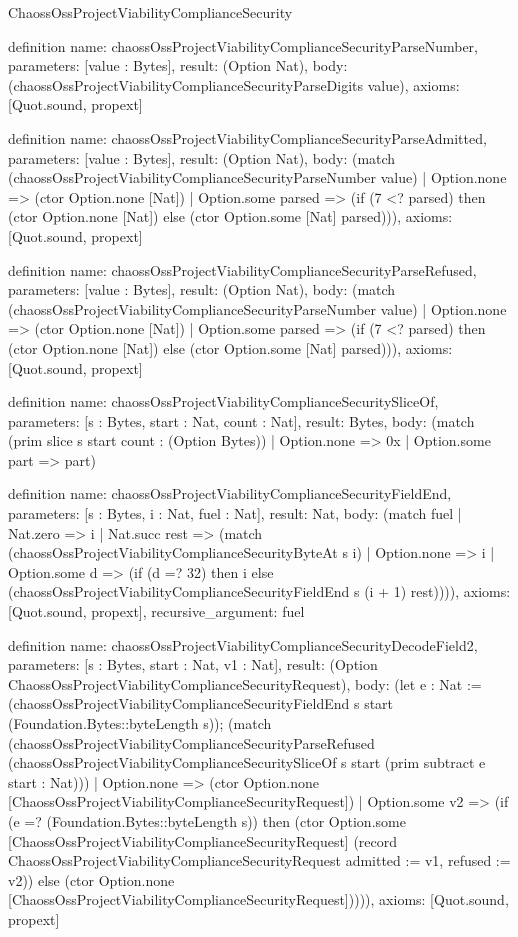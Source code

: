 \begin{lexlean}{ChaossOssProjectViabilityComplianceSecurity}
\begin{semanticmodule}
definition{
  name: chaossOssProjectViabilityComplianceSecurityParseNumber,
  parameters: [value : Bytes],
  result: (Option Nat),
  body: (chaossOssProjectViabilityComplianceSecurityParseDigits value),
  axioms: [Quot.sound, propext]
}

definition{
  name: chaossOssProjectViabilityComplianceSecurityParseAdmitted,
  parameters: [value : Bytes],
  result: (Option Nat),
  body: (match (chaossOssProjectViabilityComplianceSecurityParseNumber value)
    | Option.none => (ctor Option.none [Nat])
    | Option.some parsed => (if (7 <? parsed) then (ctor Option.none [Nat]) else (ctor Option.some [Nat] parsed))),
  axioms: [Quot.sound, propext]
}

definition{
  name: chaossOssProjectViabilityComplianceSecurityParseRefused,
  parameters: [value : Bytes],
  result: (Option Nat),
  body: (match (chaossOssProjectViabilityComplianceSecurityParseNumber value)
    | Option.none => (ctor Option.none [Nat])
    | Option.some parsed => (if (7 <? parsed) then (ctor Option.none [Nat]) else (ctor Option.some [Nat] parsed))),
  axioms: [Quot.sound, propext]
}

definition{
  name: chaossOssProjectViabilityComplianceSecuritySliceOf,
  parameters: [s : Bytes, start : Nat, count : Nat],
  result: Bytes,
  body: (match (prim slice s start count : (Option Bytes))
    | Option.none => 0x
    | Option.some part => part)
}

definition{
  name: chaossOssProjectViabilityComplianceSecurityFieldEnd,
  parameters: [s : Bytes, i : Nat, fuel : Nat],
  result: Nat,
  body: (match fuel
    | Nat.zero => i
    | Nat.succ rest => (match (chaossOssProjectViabilityComplianceSecurityByteAt s i)
      | Option.none => i
      | Option.some d => (if (d =? 32) then i else (chaossOssProjectViabilityComplianceSecurityFieldEnd s (i + 1) rest)))),
  axioms: [Quot.sound, propext],
  recursive_argument: fuel
}

definition{
  name: chaossOssProjectViabilityComplianceSecurityDecodeField2,
  parameters: [s : Bytes, start : Nat, v1 : Nat],
  result: (Option ChaossOssProjectViabilityComplianceSecurityRequest),
  body: (let e : Nat := (chaossOssProjectViabilityComplianceSecurityFieldEnd s start (Foundation.Bytes::byteLength s)); (match (chaossOssProjectViabilityComplianceSecurityParseRefused (chaossOssProjectViabilityComplianceSecuritySliceOf s start (prim subtract e start : Nat)))
    | Option.none => (ctor Option.none [ChaossOssProjectViabilityComplianceSecurityRequest])
    | Option.some v2 => (if (e =? (Foundation.Bytes::byteLength s)) then (ctor Option.some [ChaossOssProjectViabilityComplianceSecurityRequest] (record ChaossOssProjectViabilityComplianceSecurityRequest {admitted := v1, refused := v2})) else (ctor Option.none [ChaossOssProjectViabilityComplianceSecurityRequest])))),
  axioms: [Quot.sound, propext]
}


\end{semanticmodule}
\end{lexlean}
